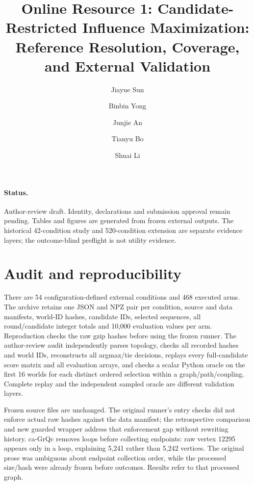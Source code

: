 \documentclass[smallextended]{svjour3}
\begin{document}
\title{Online Resource 1: Candidate-Restricted Influence Maximization: Reference Resolution, Coverage, and External Validation}
\author{Jiayue Sun \and Binbin Yong \and Junjie An \and Tianyu Bo \and Shuai Li}
\date{}\maketitle
\paragraph{Status.} Author-review draft. Identity, declarations and submission approval remain pending. Tables and figures are generated from frozen external outputs. The historical 42-condition study and 520-condition extension are separate evidence layers; the outcome-blind preflight is not utility evidence.

\section{Audit and reproducibility}
There are 54 configuration-defined external conditions and 468 executed arms.
The archive retains one JSON and NPZ pair per condition, source and data manifests,
world-ID hashes, candidate IDs, selected sequences, all round/candidate integer
totals and 10,000 evaluation values per arm. Reproduction checks the raw gzip
hashes before using the frozen runner. The author-review audit independently
parses topology, checks all recorded hashes and world IDs, reconstructs all
argmax/tie decisions, replays every full-candidate score matrix and all evaluation
arrays, and checks a scalar Python oracle on the first 16 worlds for each
distinct ordered selection within a graph/path/coupling. Complete replay and the
independent sampled oracle are different validation layers.

Frozen source files are unchanged. The original runner's entry checks did not
enforce actual raw hashes against the data manifest; the retrospective comparison
and new guarded wrapper address that enforcement gap without rewriting history.
ca-GrQc removes loops before collecting endpoints: raw vertex 12295 appears only
in a loop, explaining 5,241 rather than 5,242 vertices. The original prose was
ambiguous about endpoint collection order, while the processed size/hash were
already frozen before outcomes. Results refer to that processed graph.
\end{document}
